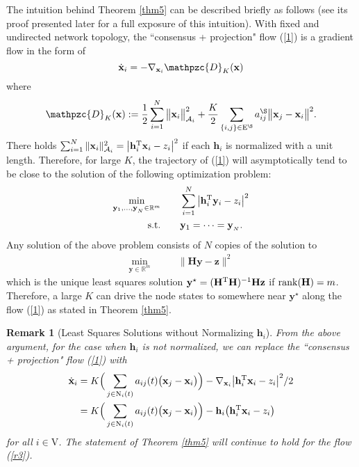 \documentclass[a4paper, 11pt]{article}
\def\T{^{\rm\tiny T}}
\newtheorem{remark}{Remark}
\begin{document}
The intuition behind Theorem \ref{thm5} can be described briefly as follows (see its proof presented later for a full exposure of this intuition). With fixed and undirected network topology,  the ``consensus + projection" flow (\ref{1}) is a gradient flow  in the form of
$$
\dot{\mathbf{x}}_i=-\nabla_{\mathbf{x}_i} \mathpzc{D}_K(\mathbf{x})
$$
where
\begin{align}
\mathpzc{D}_K(\mathbf{x}):=\frac{1}{2}\sum_{i=1}^N \big \|\mathbf{x}_i\big\|_{\mathcal{A}_i}^2+ \frac{K}{2}\sum_{\{i,j\}\in\mathrm{E}^\S}a_{ij}^\S\big\|\mathbf{x}_j-\mathbf{x}_i\big\|^2.
\end{align}
There  holds
$
\sum_{i=1}^N \|\mathbf{x}_i\|_{\mathcal{A}_i}^2=\big|\mathbf{h}_i\T \mathbf{x}_i -z_i\big|^2
$
if each $\mathbf{h}_i$ is normalized with a unit length. Therefore, for large $K$, the trajectory of (\ref{1}) will asymptotically  tend to  be close to the solution of the following optimization problem:
\[
\begin{aligned}
\min_{\mathbf{y}_1,\dots, \mathbf{y}_{_N} \in \mathbb{R}^m}\qquad &  \sum_{i=1}^N \big|\mathbf{h}_i\T \mathbf{y}_i -z_i\big|^2 \\
{\rm s.t.} \qquad  &   \mathbf{y}_1=\dots=\mathbf{y}_{_N}.
\end{aligned}
\]
Any solution of the above problem  consists of  $N$ copies of the solution to
\[
\begin{aligned}
\min_{\mathbf{y} \in \mathbb{R}^m}\qquad &   \big\|\mathbf{H} \mathbf{y} -\mathbf{z}\big\|^2
\end{aligned}
\]
which is  the unique least squares  solution $\mathbf{y}^\star=(\mathbf{H}\T\mathbf{H})^{-1}\mathbf{H}\mathbf{z}$ if ${\rm rank}(\mathbf{H})=m$. Therefore, a large $K$ can drive the node states to somewhere near $\mathbf{y}^\star$ along the flow (\ref{1}) as stated in Theorem \ref{thm5}.

\begin{remark}[Least Squares Solutions without Normalizing $\mathbf{h}_i$]
From the above argument, for the case when $\mathbf{h}_i$ is not normalized, we can replace the ``consensus + projection" flow (\ref{1}) with
\begin{align}\label{r3}
 \dot{\mathbf{x}}_i
 &=K\Big( \sum_{j\in \mathrm{N}_i(t)}a_{ij}(t)\big(\mathbf{x}_j-\mathbf{x}_i\big) \Big)- \nabla_{\mathbf{x}_i}
\big|\mathbf{h}_i\T \mathbf{x}_i -z_i \big|^2/2 \nonumber\\
&=K\Big( \sum_{j\in \mathrm{N}_i(t)}a_{ij}(t)\big(\mathbf{x}_j-\mathbf{x}_i\big) \Big)- \mathbf{h}_i \big(\mathbf{h}\T_i\mathbf{x}_i -z_i \big)
\end{align}
 for all $i\in\mathrm{V}$. The statement  of Theorem \ref{thm5} will continue to hold for the flow (\ref{r3}).
\end{remark}
\end{document}

